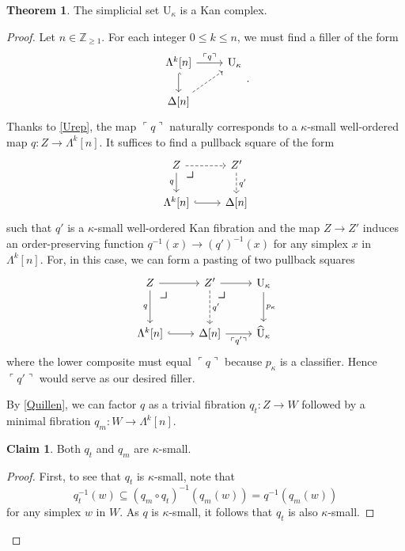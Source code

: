 \documentclass[10pt,letterpaper,cm]{nupset}
\theoremstyle{definition}
\theoremstyle{theorem}
\newtheorem{theorem}[definition]{Theorem}
\newtheorem*{claim}{Claim}
\theoremstyle{remark}
\newcommand{\Z}{\mathbb Z}
\newcommand{\0}{\mathbf{0}}
\newcommand{\1}{\mathbf{1}}
\newcommand{\2}{\mathbf{2}}
\begin{document}
\begin{theorem}\label{UKan}
The simplicial set $\mathrm{U}_{\kappa}$ is a Kan complex.
\end{theorem}
\begin{proof}
Let $n\in \Z_{\geq 1}$. For each integer $0\leq k \leq n$, we must find a filler of the form
\[
\begin{tikzcd}
{\Lambda^k[n]} \arrow[d, hook] \arrow[r, "\ulcorner{q}\urcorner"] & \mathrm{U}_{\kappa} \\
{\Delta[n]} \arrow[ru, dashed]                                    &                    
\end{tikzcd}
.\] Thanks to \cref{Urep}, the map $\ulcorner{q}\urcorner$ naturally corresponds to a $\kappa$-small well-ordered map $q : Z\to \Lambda^k[n]$. It suffices to find a pullback square of the form
\[
\begin{tikzcd}
Z \arrow[r, dashed] \arrow[d, "q"'] 
\arrow[dr, phantom, "\scalebox{1.5}{\color{black}$\lrcorner$}" , very near start, color=black]
& Z' \arrow[d, "q'", dashed] \\
{\Lambda^k[n]} \arrow[r, hook]      & {\Delta[n]}               
\end{tikzcd}
\] such that  $q'$ is a $\kappa$-small well-ordered Kan fibration and the map $Z \to Z'$  induces an order-preserving function  $q^{-1}(x) \to \left(q'\right)^{-1}(x)$ for any simplex $x$ in $\Lambda^k[n]$. For, in this case, we can form a pasting of two pullback squares
\[
\begin{tikzcd}[row sep=large]
Z \arrow[d, "q"'] \arrow[r]    
\arrow[dr, phantom, "\scalebox{1.5}{\color{black}$\lrcorner$}" , very near start, color=black] & Z' \arrow[d, "q'", dashed] \arrow[r]             
\arrow[dr, phantom, "\scalebox{1.5}{\color{black}$\lrcorner$}" , very near start, color=black]
& \mathrm{U}_{\kappa} \arrow[d, "p_{\kappa}"] \\
{\Lambda^k[n]} \arrow[r, hook] & {\Delta[n]} \arrow[r, "\ulcorner{q'}\urcorner"'] & \widehat{\mathrm{U}}_{\kappa}              
\end{tikzcd}
\] where the lower composite must equal $\ulcorner{q}\urcorner$ because $p_{\kappa}$ is a classifier. Hence $\ulcorner{q'}\urcorner$ would serve as our desired filler. 

\medskip

By \cref{Quillen}, we can factor $q$  as a trivial fibration $q_t :Z \to W$ followed by a minimal fibration $q_m: W \to \Lambda^k[n]$.
\begin{claim}
Both  $q_t$ and $q_m$ are $\kappa$-small.
\end{claim}
\begin{proof}
First, to see that $q_t$ is $\kappa$-small, note that
\[
q_{t}^{-1}(w) \subseteq\left(q_{m} \circ q_{t}\right)^{-1}\left(q_{m}(w)\right)=q^{-1}\left(q_{m}(w)\right)
\] for any simplex $w$ in $W$. As $q$ is $\kappa$-small, it follows that $q_t$ is also $\kappa$-small.


\end{proof}
\end{proof}
\end{document}
